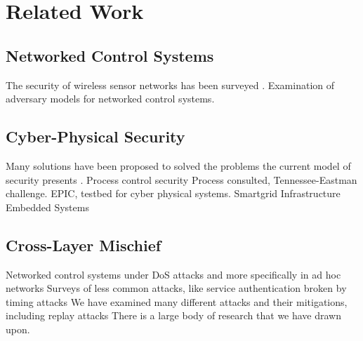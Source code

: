 \section{Related Work}
\subsection{Networked Control Systems}
The security of wireless sensor networks has been surveyed \cite{chen}.  Examination of adversary models for networked control systems. \cite{cardenas}
\subsection{Cyber-Physical Security}
Many solutions have been proposed to solved the problems the current model of security presents \cite{mclaughlin, beitollahi}.  Process control security \cite{hashimoto}  Process consulted, Tennessee-Eastman challenge. \cite{ricker} EPIC, testbed for cyber physical systems. \cite{siaterlis}  Smartgrid Infrastructure \cite{mo} Embedded Systems \
\subsection{Cross-Layer Mischief}
Networked control systems under DoS attacks \cite{amin} and more specifically in ad hoc networks \cite{radosavac} Surveys of less common attacks, like service authentication broken by timing attacks\cite{hayes}
We have examined many different attacks and their mitigations, including replay attacks \cite{mosinopoli}
There is a large body of research that we have drawn upon.